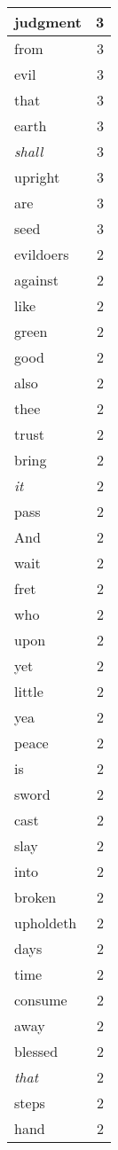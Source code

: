 \begin{center}
\begin{longtable}{l|r}
judgment & 3 \\ \hline
from & 3 \\ \hline
evil & 3 \\ \hline
that & 3 \\ \hline
earth & 3 \\ \hline
\emph{shall} & 3 \\ \hline
upright & 3 \\ \hline
are & 3 \\ \hline
seed & 3 \\ \hline
evildoers & 2 \\ \hline
against & 2 \\ \hline
like & 2 \\ \hline
green & 2 \\ \hline
good & 2 \\ \hline
also & 2 \\ \hline
thee & 2 \\ \hline
trust & 2 \\ \hline
bring & 2 \\ \hline
\emph{it} & 2 \\ \hline
pass & 2 \\ \hline
And & 2 \\ \hline
wait & 2 \\ \hline
fret & 2 \\ \hline
who & 2 \\ \hline
upon & 2 \\ \hline
yet & 2 \\ \hline
little & 2 \\ \hline
yea & 2 \\ \hline
peace & 2 \\ \hline
is & 2 \\ \hline
sword & 2 \\ \hline
cast & 2 \\ \hline
slay & 2 \\ \hline
into & 2 \\ \hline
broken & 2 \\ \hline
upholdeth & 2 \\ \hline
days & 2 \\ \hline
time & 2 \\ \hline
consume & 2 \\ \hline
away & 2 \\ \hline
blessed & 2 \\ \hline
\emph{that} & 2 \\ \hline
steps & 2 \\ \hline
hand & 2 \\ \hline

\end{longtable}
\end{center}
